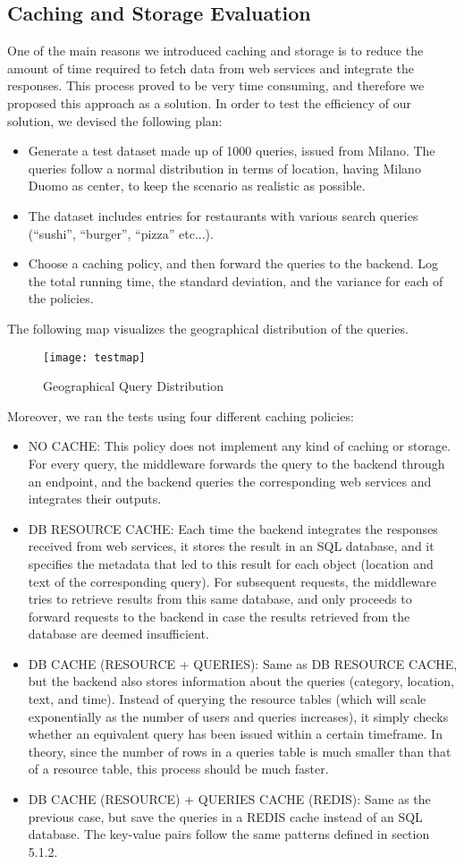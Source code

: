 \subsection{Caching and Storage Evaluation}
One of the main reasons we introduced caching and storage is to reduce the amount of time required to fetch data from web services and integrate the responses. This process proved to be very time consuming, and therefore we proposed this approach as a solution. In order to test the efficiency of our solution, we devised the following plan:
\begin{itemize}
\item Generate a test dataset made up of 1000 queries, issued from Milano. The queries follow a normal distribution in terms of location, having Milano Duomo as center, to keep the scenario as realistic as possible.
\item The dataset includes entries for restaurants with various search queries (``sushi'', ``burger'', ``pizza'' etc...).
\item Choose a caching policy, and then forward the queries to the backend. Log the total running time, the standard deviation, and the variance for each of the policies.
\end{itemize}
The following map visualizes the geographical distribution of the queries.
\begin{figure}[h]
\centering
\texttt{[image: testmap]}
\caption{Geographical Query Distribution}
\end{figure}
\newpage
Moreover, we ran the tests using four different caching policies:
\begin{itemize}
\item NO CACHE: This policy does not implement any kind of caching or storage. For every query, the middleware forwards the query to the backend through an endpoint, and the backend queries the corresponding web services and integrates their outputs.
\item DB RESOURCE CACHE: Each time the backend integrates the responses received from web services, it stores the result in an SQL database, and it specifies the metadata that led to this result for each object (location and text of the corresponding query). For subsequent requests, the middleware tries to retrieve results from this same database, and only proceeds to forward requests to the backend in case the results retrieved from the database are deemed insufficient. 
\item DB CACHE (RESOURCE + QUERIES): Same as DB RESOURCE CACHE, but the backend also stores information about the queries (category, location, text, and time). Instead of querying the resource tables (which will scale exponentially as the number of users and queries increases), it simply checks whether an equivalent query has been issued within a certain timeframe. In theory, since the number of rows in a queries table is much smaller than that of a resource table, this process should be much faster.
\item DB CACHE (RESOURCE) + QUERIES CACHE (REDIS): Same as the previous case, but save the queries in a REDIS cache instead of an SQL database. The key-value pairs follow the same patterns defined in section 5.1.2.
\end{itemize}
